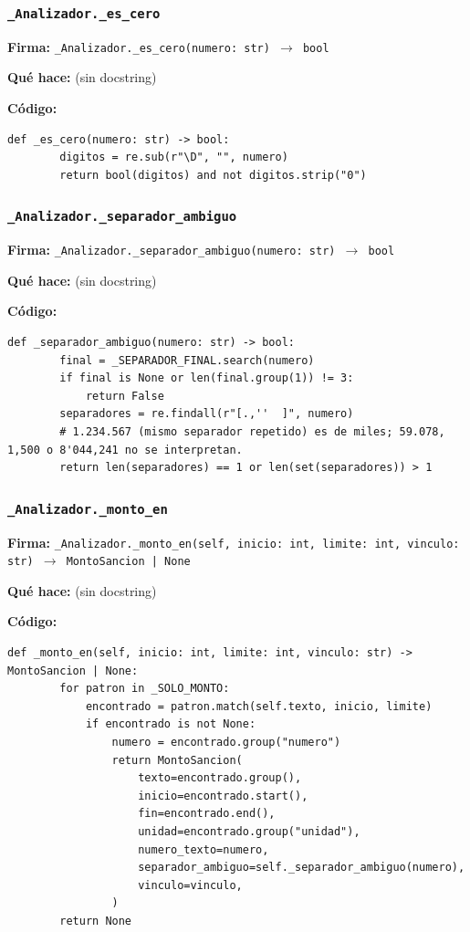 \documentclass[11pt,a4paper]{article}
\begin{document}
\subsubsection*{\texttt{\_Analizador.\_es\_cero}}
\textbf{Firma:} \texttt{\_Analizador.\_es\_cero(numero: str) $\rightarrow$ bool}

\textbf{Qué hace:} (sin docstring)

\textbf{Código:}
\begin{lstlisting}
def _es_cero(numero: str) -> bool:
        digitos = re.sub(r"\D", "", numero)
        return bool(digitos) and not digitos.strip("0")
\end{lstlisting}

\subsubsection*{\texttt{\_Analizador.\_separador\_ambiguo}}
\textbf{Firma:} \texttt{\_Analizador.\_separador\_ambiguo(numero: str) $\rightarrow$ bool}

\textbf{Qué hace:} (sin docstring)

\textbf{Código:}
\begin{lstlisting}
def _separador_ambiguo(numero: str) -> bool:
        final = _SEPARADOR_FINAL.search(numero)
        if final is None or len(final.group(1)) != 3:
            return False
        separadores = re.findall(r"[.,''  ]", numero)
        # 1.234.567 (mismo separador repetido) es de miles; 59.078, 1,500 o 8'044,241 no se interpretan.
        return len(separadores) == 1 or len(set(separadores)) > 1
\end{lstlisting}

\subsubsection*{\texttt{\_Analizador.\_monto\_en}}
\textbf{Firma:} \texttt{\_Analizador.\_monto\_en(self, inicio: int, limite: int, vinculo: str) $\rightarrow$ MontoSancion | None}

\textbf{Qué hace:} (sin docstring)

\textbf{Código:}
\begin{lstlisting}
def _monto_en(self, inicio: int, limite: int, vinculo: str) -> MontoSancion | None:
        for patron in _SOLO_MONTO:
            encontrado = patron.match(self.texto, inicio, limite)
            if encontrado is not None:
                numero = encontrado.group("numero")
                return MontoSancion(
                    texto=encontrado.group(),
                    inicio=encontrado.start(),
                    fin=encontrado.end(),
                    unidad=encontrado.group("unidad"),
                    numero_texto=numero,
                    separador_ambiguo=self._separador_ambiguo(numero),
                    vinculo=vinculo,
                )
        return None
\end{lstlisting}
\end{document}
